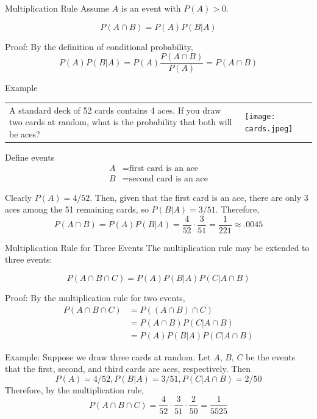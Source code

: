 \documentclass[xcolor=table]{beamer}
\begin{document}
\begin{frame}{Multiplication Rule}
Assume $A$ is an event with $P(A)>0$.
\begin{block}{}
\vspace{-.2cm}$$P(A\cap B) = P(A)P(B|A)$$
\end{block}

\pause\vspace{.3cm}Proof: By the definition of conditional probability,
$$P(A)P(B|A) = P(A)\frac{P(A\cap B)}{P(A)}=P(A\cap B)$$
\end{frame}

\begin{frame}{Example}
\begin{tabular}{@{}p{8cm}p{3cm}}
\vspace{0cm}
A standard deck of 52 cards contains 4 aces. If you draw two cards at random, what is the probability that both will be aces?
&
\vspace{0cm}
\texttt{[image: cards.jpeg]}
\end{tabular}

\vspace{.3cm}
\pause Define events
\begin{align*}
A &= \text{first card is an ace} \\
B &= \text{second card is an ace}
\end{align*}

Clearly $P(A)=4/52$. Then, given that the first card is an ace, there are only 3 aces among the 51 remaining cards, so $P(B|A)=3/51$. Therefore,
$$P(A\cap B)=P(A)P(B|A)=\frac4{52}\cdot\frac3{51}=\frac1{221}\approx .0045$$

\end{frame}

\begin{frame}{Multiplication Rule for Three Events}
The multiplication rule may be extended to three events:
\begin{block}{}
\vspace{-.2cm}$$P(A\cap B\cap C) = P(A)P(B|A)P(C|A\cap B)$$
\end{block}
\pause Proof: By the multiplication rule for two events,
\begin{align*}
P(A\cap B\cap C) &= P((A\cap B)\cap C) \\
&= P(A\cap B)P(C|A\cap B) \\ &= P(A)P(B|A)P(C|A\cap B)
\end{align*}

\pause\vspace{.2cm}
Example: Suppose we draw three cards at random. Let $A$, $B$, $C$ be the events that the first, second, and third cards are aces, respectively. Then
$$P(A)=4/52, P(B|A)=3/51, P(C|A\cap B)=2/50$$
Therefore, by the multiplication rule,
$$P(A\cap B\cap C) = \frac4{52}\cdot\frac3{51}\cdot\frac2{50}=\frac1{5525}$$
\end{frame}
\end{document}
